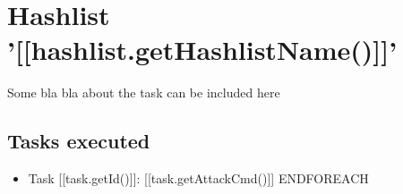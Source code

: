 \documentclass[12pt]{article}
\begin{document}
\section*{Hashlist '[[hashlist.getHashlistName()]]'}

Some bla bla about the task can be included here

\subsection*{Tasks executed}

\begin{itemize}
{{FOREACH task;[[tasks]]}}
	\item Task [[task.getId()]]: [[task.getAttackCmd()]]
{{ENDFOREACH}}
\end{itemize}
\end{document}

